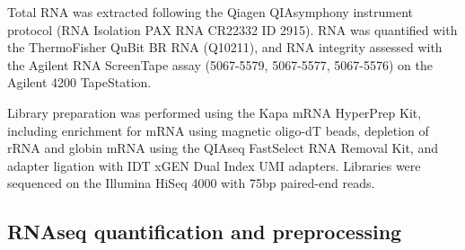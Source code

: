 %

Total RNA was extracted following the Qiagen QIAsymphony instrument protocol (RNA Isolation PAX RNA CR22332 ID 2915).
RNA was quantified with the ThermoFisher QuBit BR RNA (Q10211), 
and RNA integrity assessed with the Agilent RNA ScreenTape assay (5067-5579, 5067-5577, 5067-5576) on the Agilent 4200 TapeStation.

Library preparation was performed using the Kapa mRNA HyperPrep Kit, including enrichment for mRNA using magnetic oligo-dT beads, depletion of rRNA and globin mRNA using the QIAseq FastSelect RNA Removal Kit, and adapter ligation with IDT xGEN Dual Index UMI adapters.
Libraries were sequenced on the Illumina HiSeq 4000 with \si{75}{bp} paired-end reads.

\subsection{RNAseq quantification and preprocessing}

